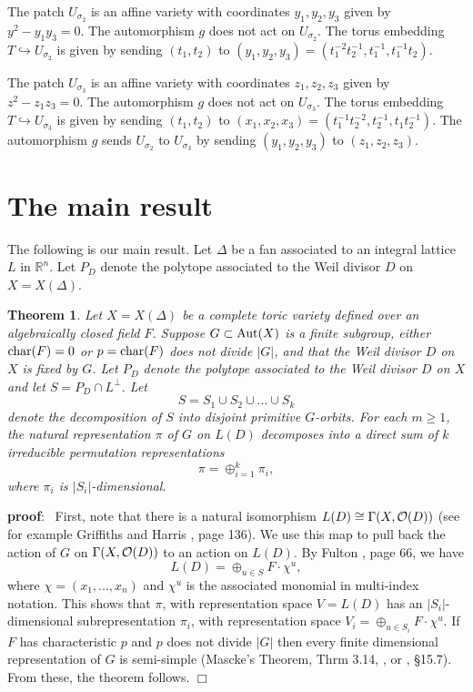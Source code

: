 \documentclass[12pt]{article}
\newtheorem{theorem}{Theorem}
\def\rrr{\mathbb{R}}
\def\pf{{\bf proof}:\ }
\def\qed{$\Box$}
\begin{document}
The patch $U_{\sigma_2}$ is an affine variety with 
coordinates $y_1,y_2,y_3$ given by $y^2-y_1y_3=0$. 
The automorphism $g$ does not act on $U_{\sigma_2}$.
The torus embedding
$T\hookrightarrow U_{\sigma_2}$ is given by
sending $(t_1,t_2)$ to 
$(y_1,y_2,y_3)=(t_1^{-2}t_2^{-1},t_1^{-1},t_1^{-1}t_2)$.

The patch $U_{\sigma_3}$ is an affine variety with 
coordinates $z_1,z_2,z_3$ given by $z^2-z_1z_3=0$. 
The automorphism $g$ does not act on $U_{\sigma_3}$.
The torus embedding
$T\hookrightarrow U_{\sigma_3}$ is given by
sending $(t_1,t_2)$ to 
$(x_1,x_2,x_3)=(t_1^{-1}t_2^{-2},t_2^{-1},t_1t_2^{-1})$.
The automorphism $g$ sends $U_{\sigma_2}$ to $U_{\sigma_3}$
by sending $(y_1,y_2,y_3)$ to $(z_1,z_2,z_3)$.


\section{The main result}

The following is our main result.
Let $\Delta$ be a fan associated to an integral
lattice $L$ in $\rrr^n$. Let $P_D$ denote the polytope
associated to the Weil divisor $D$ on $X=X(\Delta)$.


\begin{theorem}
Let $X=X(\Delta)$ be a complete toric variety defined over
an algebraically closed field $F$. Suppose $G\subset {\rm Aut}(X)$
is a finite subgroup, either ${\rm char}(F)=0$ or
$p={\rm char}(F)$ does not divide $|G|$, and that the 
Weil divisor $D$ on $X$ is fixed by $G$.
Let $P_D$ denote the polytope
associated to the Weil divisor $D$ on $X$ and let
$S=P_D\cap L^\perp$. Let 
\[
S=S_1\cup S_2\cup ...\cup S_k
\]
denote the decomposition of $S$ into disjoint primitive $G$-orbits.
For each $m\geq 1$, the natural representation $\pi$ of $G$ on
$L(D)$ decomposes into a direct sum of $k$ irreducible
permutation representations
\[
\pi =\oplus_{i=1}^k \pi_i,
\]
where $\pi_i$ is $|S_i|$-dimensional.
\end{theorem}

\pf
First, note that there is a natural isomorphism
$L(D)\cong \Gamma(X,{\cal O}(D))$
(see for example Griffiths and Harris \cite{GH}, page 136).
We use this map to pull back the action of $G$ on
$\Gamma(X,{\cal O}(D))$ to an action on $L(D)$.
By Fulton \cite{F}, page 66, we have
\[
L(D)=\oplus_{u\in S} F\cdot \chi^u,
\]
where $\chi=(x_1,...,x_n)$ and $\chi^u$ is the
associated monomial in multi-index notation.
This shows that $\pi$,
with representation space $V=L(D)$ 
has an $|S_i|$-dimensional subrepresentation $\pi_i$,
with representation space $V_i=\oplus_{u\in S_i} F\cdot \chi^u$.
If $F$ has characteristic $p$ and $p$ does not divide $|G|$
then every finite dimensional representation of $G$
is semi-simple (Mascke's Theorem, Thrm 3.14, \cite{CR}, or
\cite{Se}, \S 15.7).
From these, the theorem follows.
\qed
\end{document}
